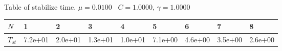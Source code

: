 \begin{center}
Table of stabilize time. $\mu = 0.0100$ \, $C = 1.0000$, $\gamma = 1.0000$
  
\begin{tabular}{|p{0.6in}|p{0.6in}|p{0.6in}|p{0.6in}|p{0.6in}|p{0.6in}|p{0.6in}|p{0.6in}|p{0.6in}|} \hline
$N$ &1 &2 &3 &4 &5 &6 &7 &8 \\ \hline 
$T_{st}$ &7.2e+01 &2.0e+01 &1.3e+01 &1.0e+01 &7.1e+00 &4.6e+00 &3.5e+00 &2.6e+00 \\ \hline 

\end{tabular}\\[20pt]
\end{center}
